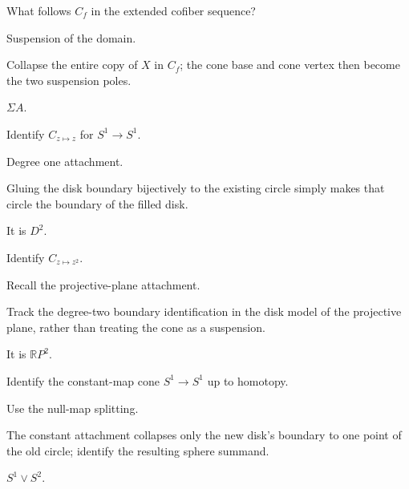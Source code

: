 \begin{exercise}\label{exr:viii07-11}
What follows \(C_f\) in the extended cofiber sequence?
\end{exercise}
\begin{hint}
Suspension of the domain.

Collapse the entire copy of \(X\) in \(C_f\); the cone base and cone vertex then become the two suspension poles.
\end{hint}
\begin{solution}
\(\Sigma A\).
\end{solution}

\begin{exercise}\label{exr:viii07-12}
Identify \(C_{z\mapsto z}\) for \(S^1\to S^1\).
\end{exercise}
\begin{hint}
Degree one attachment.

Gluing the disk boundary bijectively to the existing circle simply makes that circle the boundary of the filled disk.
\end{hint}
\begin{solution}
It is \(D^2\).
\end{solution}

\begin{exercise}\label{exr:viii07-13}
Identify \(C_{z\mapsto z^2}\).
\end{exercise}
\begin{hint}
Recall the projective-plane attachment.

Track the degree-two boundary identification in the disk model of the projective plane, rather than treating the cone as a suspension.
\end{hint}
\begin{solution}
It is \(\mathbb RP^2\).
\end{solution}

\begin{exercise}\label{exr:viii07-14}
Identify the constant-map cone \(S^1\to S^1\) up to homotopy.
\end{exercise}
\begin{hint}
Use the null-map splitting.

The constant attachment collapses only the new disk's boundary to one point of the old circle; identify the resulting sphere summand.
\end{hint}
\begin{solution}
\(S^1\vee S^2\).
\end{solution}

